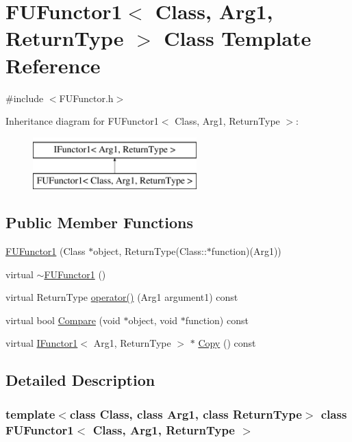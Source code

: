 \hypertarget{classFUFunctor1}{
\section{FUFunctor1$<$ Class, Arg1, ReturnType $>$ Class Template Reference}
\label{classFUFunctor1}
}


{\ttfamily \#include $<$FUFunctor.h$>$}

Inheritance diagram for FUFunctor1$<$ Class, Arg1, ReturnType $>$:\begin{figure}[H]
\begin{center}
\leavevmode
\includegraphics[height=2.000000cm]{classFUFunctor1}
\end{center}
\end{figure}
\subsection*{Public Member Functions}
\begin{DoxyCompactItemize}
\item 
\hyperlink{classFUFunctor1_a19c16dfecf1b7c0a53e073d5045aca17}{FUFunctor1} (Class $\ast$object, ReturnType(Class::$\ast$function)(Arg1))
\item 
virtual \hyperlink{classFUFunctor1_a6f45f5da9033a7f729501e83fcbcea36}{$\sim$FUFunctor1} ()
\item 
virtual ReturnType \hyperlink{classFUFunctor1_a4d13afbd6a7efb778dbbfa808e966a8d}{operator()} (Arg1 argument1) const 
\item 
virtual bool \hyperlink{classFUFunctor1_a37c91c41c965d33a15a26aab7f365330}{Compare} (void $\ast$object, void $\ast$function) const 
\item 
virtual \hyperlink{classIFunctor1}{IFunctor1}$<$ Arg1, ReturnType $>$ $\ast$ \hyperlink{classFUFunctor1_a7c94fa2ef449d7d1791b9f18db53c72e}{Copy} () const 
\end{DoxyCompactItemize}


\subsection{Detailed Description}
\subsubsection*{template$<$class Class, class Arg1, class ReturnType$>$ class FUFunctor1$<$ Class, Arg1, ReturnType $>$}

